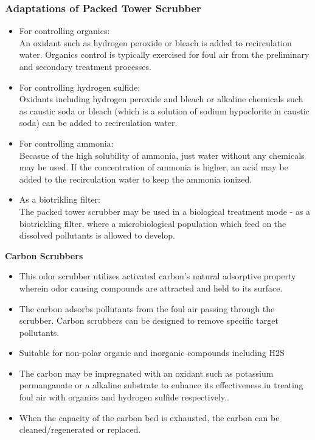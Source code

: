 \subsubsection{Adaptations of Packed Tower Scrubber}
		\begin{itemize}
			\item For controlling organics:\\
An oxidant such as hydrogen peroxide or bleach is added to recirculation water.  Organics control is typically exercised for foul air from the preliminary and secondary treatment processes.\\
			\item For controlling hydrogen sulfide:\\
			
Oxidants including hydrogen peroxide and bleach or alkaline chemicals such as caustic soda or bleach (which is a solution of sodium hypoclorite in caustic soda) can be added to recirculation water. 
\item For controlling ammonia:\\
Becasue of the high solubility of ammonia, just water without any chemicals may be used.  If the concentration of ammonia is higher, an acid may be added to the recirculation water to keep the ammonia ionized.\\

\item As a biotrikling filter:\\
The packed tower scrubber may be used in a biological treatment mode - as a biotrickling filter, where a microbiological population which feed on the dissolved pollutants is allowed to develop. \\
\end{itemize}

\textbf{Carbon Scrubbers}
\begin{itemize}
\item This odor scrubber utilizes activated carbon’s natural adsorptive property wherein odor causing compounds are attracted and held to its surface.
\item The carbon adsorbs pollutants from the foul air passing through the scrubber.
Carbon scrubbers can be designed to remove specific target pollutants.
\item Suitable for non-polar organic and inorganic compounds including H2S
\item The carbon may be impregnated with an oxidant such as potassium permanganate or a alkaline substrate to enhance its effectiveness in treating foul air with organics and hydrogen sulfide respectively..
\item When the capacity of the carbon bed is exhausted, the carbon can be cleaned/regenerated or replaced.
\end{itemize}

